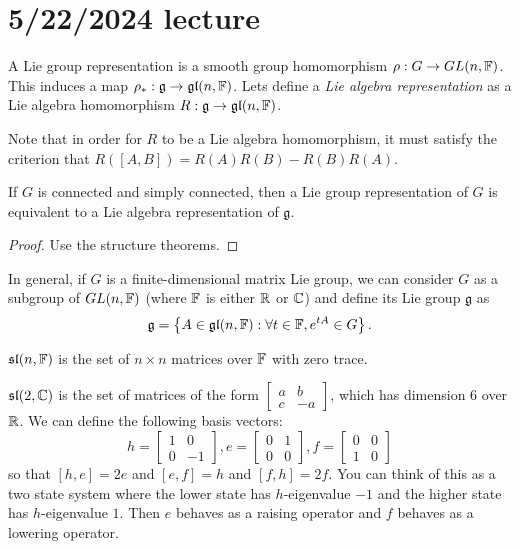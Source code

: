 \documentclass[class=article, crop=false]{standalone}
\begin{document}
\section{5/22/2024 lecture}
A Lie group representation is a smooth group homomorphism $\rho: G \rightarrow GL(n, \mathbb{F})$. This induces a map $\rho_*: \mathfrak{g} \rightarrow \mathfrak{gl}(n, \mathbb{F})$. Lets define a \textit{Lie algebra representation} as a Lie algebra homomorphism $R: \mathfrak{g} \rightarrow \mathfrak{gl}(n,\mathbb{F})$.
\par
Note that in order for $R$ to be a Lie algebra homomorphism, it must satisfy the criterion that $R([A,B])=R(A)R(B)-R(B)R(A)$.
\begin{prop}
    If $G$ is connected and simply connected, then a Lie group representation of $G$ is equivalent to a Lie algebra representation of $\mathfrak{g}$.
\end{prop}
\begin{proof}
    Use the structure theorems.
\end{proof}
In general, if $G$ is a finite-dimensional matrix Lie group, we can consider $G$ as a subgroup of $GL(n, \mathbb{F})$ (where $\mathbb{F}$ is either $\mathbb{R}$ or $\mathbb{C}$) and define its Lie group $\mathfrak{g}$ as
\[ \mathfrak{g} = \left\{ A \in \mathfrak{gl}(n, \mathbb{F}) : \forall t \in \mathbb{F}, e^{tA} \in G \right\}. \]
\begin{example}
    $\mathfrak{sl}(n, \mathbb{F})$ is the set of $n \times n$ matrices over $\mathbb{F}$ with zero trace.
\end{example}
\begin{example}
    $\mathfrak{sl}(2,\mathbb{C})$ is the set of matrices of the form $ \begin{bmatrix}
        a & b \\
        c & -a
    \end{bmatrix}$, which has dimension 6 over $\mathbb{R}$. We can define the following basis vectors:
    \[ h=\begin{bmatrix}
        1 & 0 \\
        0 & -1
    \end{bmatrix}, e=\begin{bmatrix}
        0 & 1 \\
        0 & 0
    \end{bmatrix}, f=\begin{bmatrix}
        0 & 0 \\
        1 & 0
    \end{bmatrix} \]
    so that $[h,e]=2e$ and $[e,f]=h$ and $[f,h]=2f$. You can think of this as a two state system where the lower state has $h$-eigenvalue $-1$ and the higher state has $h$-eigenvalue $1$. Then $e$ behaves as a raising operator and $f$ behaves as a lowering operator.
\end{example}
\end{document}
